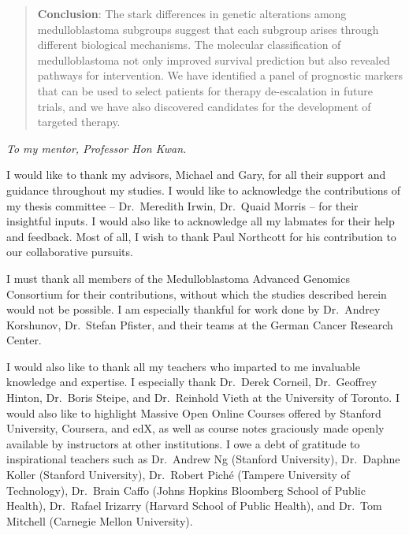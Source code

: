 \documentclass[12pt]{ut-thesis}
\begin{document}
\begin{preliminary}
\begin{abstract}
\textbf{Conclusion}: The stark differences in genetic alterations among medulloblastoma subgroups suggest that each subgroup arises through different biological mechanisms. The molecular classification of medulloblastoma not only improved survival prediction but also revealed pathways for intervention. We have identified a panel of prognostic markers that can be used to select patients for therapy de-escalation in future trials, and we have also discovered candidates for the development of targeted therapy.
\end{abstract}

\cleardoublepage

\begin{dedication}
\begin{center}
\vspace{1in}
\emph{To my mentor, Professor Hon Kwan.}
\end{center}
\end{dedication}

\newpage

\begin{acknowledgements}
I would like to thank my advisors, Michael and Gary, for all their support and guidance throughout my studies. I would like to acknowledge the contributions of my thesis committee -- Dr.\ Meredith Irwin, Dr.\ Quaid Morris -- for their insightful inputs. I would also like to acknowledge all my labmates for their help and feedback. Most of all, I wish to thank Paul Northcott for his contribution to our collaborative pursuits.

I must thank all members of the Medulloblastoma Advanced Genomics Consortium for their contributions, without which the studies described herein would not be possible. I am especially thankful for work done by Dr.\ Andrey Korshunov, Dr.\ Stefan Pfister, and their teams at the German Cancer Research Center.

I would also like to thank all my teachers who imparted to me invaluable knowledge and expertise. I especially thank Dr.\ Derek Corneil, Dr.\ Geoffrey Hinton, Dr.\ Boris Steipe, and Dr.\ Reinhold Vieth at the University of Toronto. I would also like to highlight Massive Open Online Courses offered by Stanford University, Coursera, and edX, as well as course notes graciously made openly available by instructors at other institutions. I owe a debt of gratitude to inspirational teachers such as Dr.\ Andrew Ng (Stanford University), Dr.\ Daphne Koller (Stanford University), Dr.\ Robert Pich\'{e} (Tampere University of Technology), Dr.\ Brain Caffo (Johns Hopkins Bloomberg School of Public Health), Dr.\ Rafael Irizarry (Harvard School of Public Health), and Dr.\ Tom Mitchell (Carnegie Mellon University).


\end{acknowledgements}
\end{preliminary}
\end{document}
